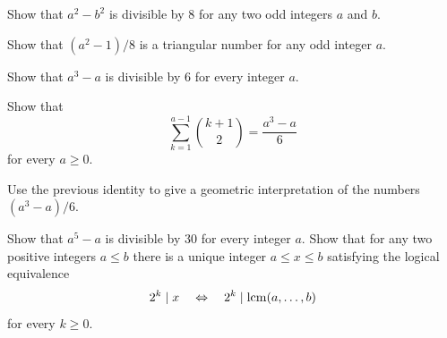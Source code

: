 \begin{routine}
  \exercise 
  \begin{subexenum}
  \item Show that $a^2-b^2$ is divisible by $8$ for any two odd integers $a$ and $b$.
  \item Show that $(a^2-1)/8$ is a triangular number for any odd integer $a$.
  \end{subexenum}
  \exercise
  \label{exercise:div-third-power-minus-first-power}
  \begin{subexenum}
  \item Show that $a^3-a$ is divisible by $6$ for every integer $a$.
  \item Show that
    \begin{equation*}
      \sum_{k=1}^{a-1}\binom{k+1}{2}=\frac{a^3-a}{6}
    \end{equation*}
    for every $a\geq 0$.
  \item Use the previous identity to give a geometric interpretation of the numbers $(a^3-a)/6$.
  \end{subexenum}
  \exercise
  \label{exercise:div-fifth-power-minus-first-power}
  Show that $a^5-a$ is divisible by $30$ for every integer $a$.  
  \exercise Show that for any two positive integers $a \leq b$ there is a unique integer $a\leq x \leq b$ satisfying the logical equivalence
  \begin{equation*}
    2^k\mid x\quad\Leftrightarrow\quad 2^k\mid \operatorname*{lcm}(a,\ldots,b)
  \end{equation*}
  for every $k\geq 0$.
\end{routine}

